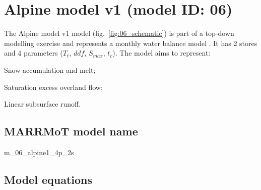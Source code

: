 \section{Alpine model v1 (model ID: 06)}
The Alpine model v1 model (fig.~\ref{fig:06_schematic}) is part of a top-down modelling exercise and represents a monthly water balance model \citep{Eder2003}. 
It has 2 stores and 4 parameters ($T_t$, $ddf$, $S_{max}$, $t_c$). 
The model aims to represent:

\begin{itemizecompact}
\item Snow accumulation and melt;
\item Saturation excess overland flow;
\item Linear subsurface runoff.
\end{itemizecompact}

\subsection{MARRMoT model name}
m\_06\_alpine1\_4p\_2s \\

\subsection{Model equations}

